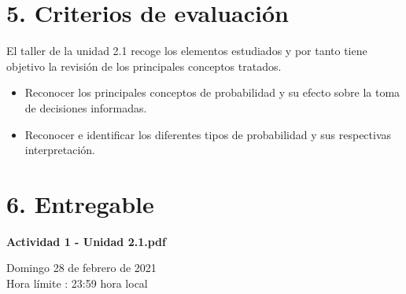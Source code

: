 \documentclass[base=hide,12pt]{elegantbook}
\begin{document}
\section*{5. Criterios de evaluación}

El taller de la unidad 2.1 recoge los elementos estudiados y por tanto  tiene objetivo la revisión de los principales conceptos tratados.

\begin{itemize}
	\item Reconocer los principales conceptos de  probabilidad y su efecto sobre la toma de decisiones informadas.
	\item Reconocer e identificar los diferentes tipos de probabilidad  y sus respectivas interpretación.
\end{itemize}

\section*{6. Entregable}

\textcolor{col4}{\bf Actividad 1 - Unidad 2.1.pdf} 
\vspace{.2cm}

Domingo 28 de febrero de 2021 \\
Hora límite : 23:59  hora  local
%

	
\end{document}
